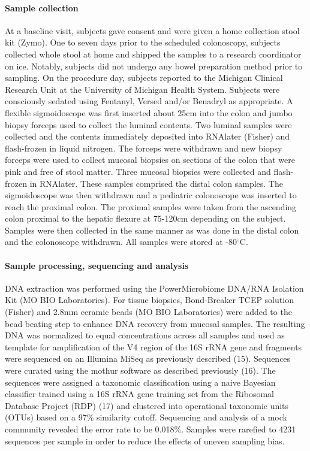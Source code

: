 \documentclass[12pt,]{article}
\let\oldparagraph\paragraph
\renewcommand{\paragraph}[1]{\oldparagraph{#1}\mbox{}}
\begin{document}
\paragraph{Sample collection}\label{sample-collection}

At a baseline visit, subjects gave consent and were given a home
collection stool kit (Zymo). One to seven days prior to the scheduled
colonoscopy, subjects collected whole stool at home and shipped the
samples to a research coordinator on ice. Notably, subjects did not
undergo any bowel preparation method prior to sampling. On the procedure
day, subjects reported to the Michigan Clinical Research Unit at the
University of Michigan Health System. Subjects were consciously sedated
using Fentanyl, Versed and/or Benadryl as appropriate. A flexible
sigmoidoscope was first inserted about 25cm into the colon and jumbo
biopsy forceps used to collect the luminal contents. Two luminal samples
were collected and the contents immediately deposited into RNAlater
(Fisher) and flash-frozen in liquid nitrogen. The forceps were withdrawn
and new biopsy forceps were used to collect mucosal biopsies on sections
of the colon that were pink and free of stool matter. Three mucosal
biopsies were collected and flash-frozen in RNAlater. These samples
comprised the distal colon samples. The sigmoidoscope was then withdrawn
and a pediatric colonoscope was inserted to reach the proximal colon.
The proximal samples were taken from the ascending colon proximal to the
hepatic flexure at 75-120cm depending on the subject. Samples were then
collected in the same manner as was done in the distal colon and the
colonoscope withdrawn. All samples were stored at -80\(^\circ\)C.

\paragraph{Sample processing, sequencing and
analysis}\label{sample-processing-sequencing-and-analysis}

DNA extraction was performed using the PowerMicrobiome DNA/RNA Isolation
Kit (MO BIO Laboratories). For tissue biopsies, Bond-Breaker TCEP
solution (Fisher) and 2.8mm ceramic beads (MO BIO Laboratories) were
added to the bead beating step to enhance DNA recovery from mucosal
samples. The resulting DNA was normalized to equal concentrations across
all samples and used as template for amplification of the V4 region of
the 16S rRNA gene and fragments were sequenced on an Illumina MiSeq as
previously described (15). Sequences were curated using the mothur
software as described previously (16). The sequences were assigned a
taxonomic classification using a naive Bayesian classifier trained using
a 16S rRNA gene training set from the Ribosomal Database Project (RDP)
(17) and clustered into operational taxonomic units (OTUs) based on a
97\% similarity cutoff. Sequencing and analysis of a mock community
revealed the error rate to be 0.018\%. Samples were rarefied to 4231
sequences per sample in order to reduce the effects of uneven sampling
bias.
\end{document}

